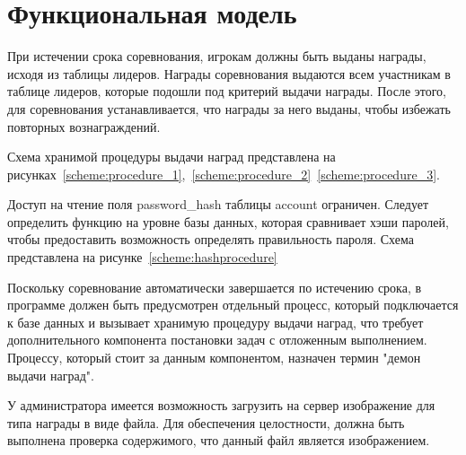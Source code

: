 \section{Функциональная модель}
При истечении срока соревнования, игрокам должны быть выданы награды, исходя из таблицы лидеров. Награды соревнования выдаются всем участникам в таблице лидеров, которые подошли под критерий выдачи награды. После этого, для соревнования устанавливается, что награды за него выданы, чтобы избежать повторных вознаграждений.

Схема хранимой процедуры выдачи наград представлена на рисунках~\ref{scheme:procedure_1},~\ref{scheme:procedure_2}~\ref{scheme:procedure_3}.

Доступ на чтение поля password\_hash таблицы account ограничен. Следует определить функцию на уровне базы данных, которая сравнивает хэши паролей, чтобы предоставить возможность определять правильность пароля. Схема представлена на рисунке~\ref{scheme:hashprocedure}


Поскольку соревнование автоматически завершается по истечению срока, в программе должен быть предусмотрен отдельный процесс, который подключается к базе данных и вызывает хранимую процедуру выдачи наград, что требует дополнительного компонента постановки задач с отложенным выполнением. Процессу, который стоит за данным компонентом, назначен термин "демон выдачи наград".

У администратора имеется возможность загрузить на сервер изображение для типа награды в виде файла. Для обеспечения целостности, должна быть выполнена проверка содержимого, что данный файл является изображением.


